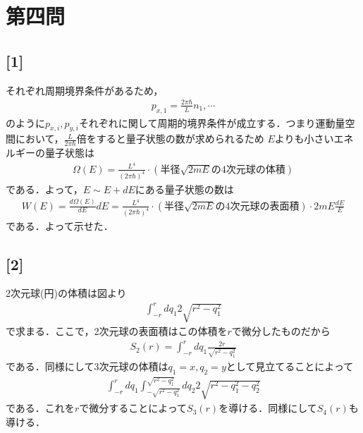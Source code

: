 \documentclass[12pt,dvipdfmx]{jsarticle}
\begin{document}
\section*{\Large{第四問}}
\subsection*{\large{[1]}}
それぞれ周期境界条件があるため，
\begin{eqnarray}
  p_{x,1} = \frac{2\pi\hbar}{L}n_1,\cdots
\end{eqnarray}
のように$p_{x,i},p_{y,i}$それぞれに関して周期的境界条件が成立する．つまり運動量空間において，$\frac{L}{2\pi\hbar}$倍をすると量子状態の数が求められるため
$E$よりも小さいエネルギーの量子状態は
\begin{eqnarray}
  \Omega(E)=\frac{L^{4}}{(2\pi\hbar)^4}\cdot (半径\sqrt{2mE}の4次元球の体積)
\end{eqnarray}
である．よって，$E\sim E+dE$にある量子状態の数は
\begin{eqnarray}
  W(E) = \frac{d\Omega(E)}{dE}dE = \frac{L^{4}}{(2\pi\hbar)^4}\cdot (半径\sqrt{2mE}の4次元球の表面積)\cdot 2mE \frac{dE}{E}
\end{eqnarray}
である．よって示せた．
\subsection*{\large{[2]}}
2次元球(円)の体積は図より
\begin{eqnarray}
  \int_{-r}^{r} dq_1 2\sqrt{r^2-q_1^2}
\end{eqnarray}
で求まる．ここで，2次元球の表面積はこの体積を$r$で微分したものだから
\begin{eqnarray}
  S_2(r) = \int_{-r}^{r} dq_1 \frac{2r}{\sqrt{r^2-q_1^2}}
\end{eqnarray}
である．同様にして3次元球の体積は$q_1=x,q_2=y$として見立てることによって
\begin{eqnarray}
  \int_{-r}^{r}dq_1 \int_{-\sqrt{r^2-q_1^2}}^{\sqrt{r^2-q_1^2}}dq_2 2\sqrt{r^2-q_1^2-q_2^2}
\end{eqnarray}
である．これを$r$で微分することによって$S_3(r)$を導ける．同様にして$S_4(r)$も導ける．
\end{document}
